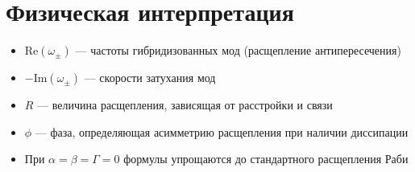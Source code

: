\documentclass[12pt,a4paper]{article}
\begin{document}
\section{Физическая интерпретация}

\begin{itemize}
\item $\text{Re}(\omega_\pm)$ — частоты гибридизованных мод (расщепление антипересечения)
\item $-\text{Im}(\omega_\pm)$ — скорости затухания мод
\item $R$ — величина расщепления, зависящая от расстройки и связи
\item $\phi$ — фаза, определяющая асимметрию расщепления при наличии диссипации
\item При $\alpha = \beta = \Gamma = 0$ формулы упрощаются до стандартного расщепления Раби
\end{itemize}
\end{document}
